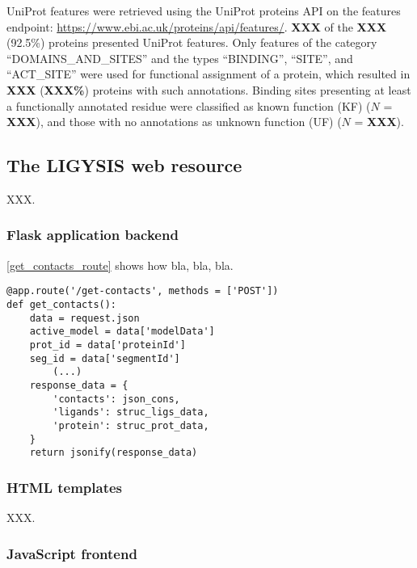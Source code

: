 UniProt features were retrieved using the UniProt proteins API \cite{NIGHTINGALE_2017_API} on the features endpoint: \url{https://www.ebi.ac.uk/proteins/api/features/}. \textbf{XXX} of the \textbf{XXX} (92.5\%) proteins presented UniProt features. Only features of the category ``DOMAINS\_AND\_SITES'' and the types ``BINDING'', ``SITE'', and ``ACT\_SITE'' were used for functional assignment of a protein, which resulted in \textbf{XXX} (\textbf{XXX\%}) proteins with such annotations. Binding sites presenting at least a functionally annotated residue were classified as known function (KF) ($N$ = \textbf{XXX}), and those with no annotations as unknown function (UF) ($N$ = \textbf{XXX}). 

\subsection{The LIGYSIS web resource}

XXX.

\subsubsection{Flask application backend}

\autoref{get_contacts_route} shows how bla, bla, bla.

\lstset{style=mystyle}

\begin{lstlisting}[language=MyPython, caption={[/get-contacts route]\textbf{/get-contacts route.} This Python code block shows an example of a Flask Web Application route that bla, bla, bla.}, label={get_contacts_route}]
@app.route('/get-contacts', methods = ['POST'])
def get_contacts():
    data = request.json
    active_model = data['modelData']
    prot_id = data['proteinId']
    seg_id = data['segmentId']
		(...)	
    response_data = {
        'contacts': json_cons,
        'ligands': struc_ligs_data,
        'protein': struc_prot_data,
    }
    return jsonify(response_data)
\end{lstlisting}

\subsubsection{HTML templates}

XXX.

\subsubsection{JavaScript frontend}

